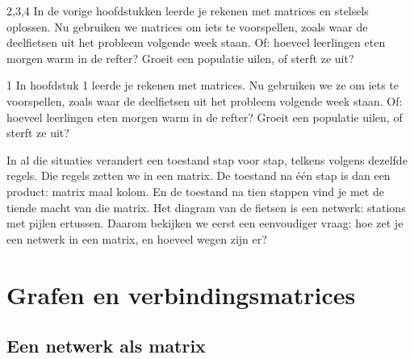 \begin{alleenvoor}{2,3,4}
In de vorige hoofdstukken leerde je rekenen met matrices en stelsels oplossen. Nu gebruiken we matrices om iets te voorspellen, zoals waar de deelfietsen uit het probleem volgende week staan. Of: hoeveel leerlingen eten morgen warm in de refter? Groeit een populatie uilen, of sterft ze uit?
\end{alleenvoor}
\begin{alleenvoor}{1}
In hoofdstuk 1 leerde je rekenen met matrices. Nu gebruiken we ze om iets te voorspellen, zoals waar de deelfietsen uit het probleem volgende week staan. Of: hoeveel leerlingen eten morgen warm in de refter? Groeit een populatie uilen, of sterft ze uit?
\end{alleenvoor}

In al die situaties verandert een toestand stap voor stap, telkens volgens dezelfde regels. Die regels zetten we in een matrix. De toestand na één stap is dan een product: matrix maal kolom. En de toestand na tien stappen vind je met de tiende macht van die matrix. Het diagram van de fietsen is een netwerk: stations met pijlen ertussen. Daarom bekijken we eerst een eenvoudiger vraag: hoe zet je een netwerk in een matrix, en hoeveel wegen zijn er?

\begin{oefeningen}[Start]

\end{oefeningen}


\section{Grafen en verbindingsmatrices}

\subsection{Een netwerk als matrix}

